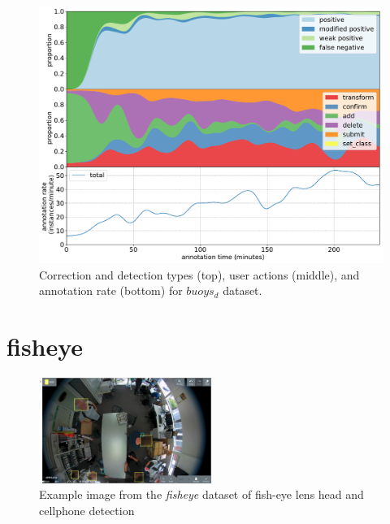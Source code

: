 \begin{figure}[!h]
\centering
\includegraphics[width=1.0\linewidth]{charts/action_annotations/buoys.pdf}
\caption{Correction and detection types (top), user actions (middle), and annotation rate (bottom) for $buoys_d$ dataset.}
\label{fig:buoys_annotation}
\end{figure}

\pagebreak
\section{fisheye}
\label{sec:fisheye_details}


\begin{figure}[H]
\begin{center}
  \includegraphics[width=0.5\textwidth]{figures/annotation/screenshots/victor.png}
\end{center}
  \caption{Example image from the \emph{fisheye} dataset of fish-eye lens head and cellphone detection }
\end{figure}

